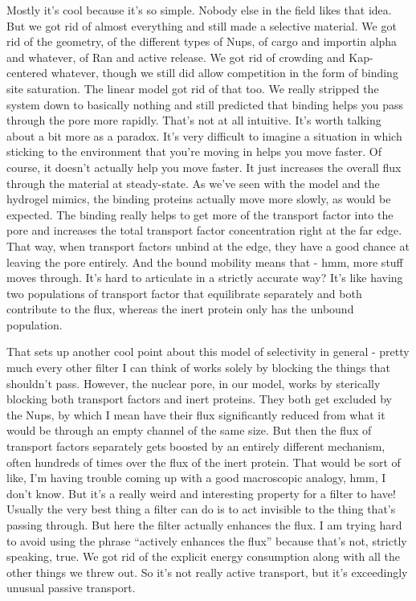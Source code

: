 {Mostly it's cool because it's so simple.  Nobody else in the field likes that idea.  But we got rid of almost everything and still made a selective material.  We got rid of the geometry, of the different types of Nups, of cargo and importin alpha and whatever, of Ran and active release.  We got rid of crowding and Kap-centered whatever, though we still did allow competition in the form of binding site saturation.  The linear model got rid of that too.  We really stripped the system down to basically nothing and still predicted that binding helps you pass through the pore more rapidly.  That's not at all intuitive.  It's worth talking about a bit more as a paradox.  It's very difficult to imagine a situation in which sticking to the environment that you're moving in helps you move faster.  Of course, it doesn't actually help you move faster.  It just increases the overall flux through the material at steady-state.  As we've seen with the model and the hydrogel mimics, the binding proteins actually move more slowly, as would be expected.  The binding really helps to get more of the transport factor into the pore and increases the total transport factor concentration right at the far edge.  That way, when transport factors unbind at the edge, they have a good chance at leaving the pore entirely.  And the bound mobility means that  - hmm, more stuff moves through.  It's hard to articulate in a strictly accurate way?  It's like having two populations of transport factor that equilibrate separately and both contribute to the flux, whereas the inert protein only has the unbound population.

That sets up another cool point about this model of selectivity in general - pretty much every other filter I can think of works solely by blocking the things that shouldn't pass.  However, the nuclear pore, in our model, works by sterically blocking both transport factors and inert proteins.  They both get excluded by the Nups, by which I mean have their flux significantly reduced from what it would be through an empty channel of the same size.  But then the flux of transport factors separately gets boosted by an entirely different mechanism, often hundreds of times over the flux of the inert protein.  That would be sort of like, I'm having trouble coming up with a good macroscopic analogy, hmm, I don't know.  But it's a really weird and interesting property for a filter to have!  Usually the very best thing a filter can do is to act invisible to the thing that's passing through.  But here the filter actually enhances the flux.  I am trying hard to avoid using the phrase ``actively enhances the flux'' because that's not, strictly speaking, true.  We got rid of the explicit energy consumption along with all the other things we threw out.  So it's not really active transport, but it's exceedingly unusual passive transport.

}
